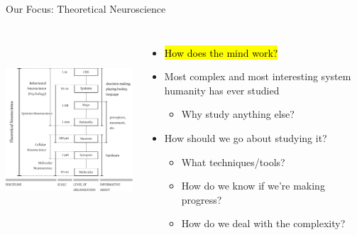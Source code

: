 \documentclass[handout,aspectratio=169]{beamer}
\begin{document}
\begin{frame}{Our Focus: Theoretical Neuroscience}
	\begin{columns}[c]
			\begin{center}
				\vspace{-0.5cm}
				\includegraphics[height=7cm]{media/levels.pdf}
			\end{center}
		\begin{itemize}
			\setlength\itemsep{0.25cm}
			\item<2-> \hl{How does the mind work?}
			\item<3-> Most complex and most interesting system humanity has ever studied\\[0.125cm]
			\begin{itemize}
				\setlength\itemsep{0.25cm}
				\item Why study anything else?
			\end{itemize}
			\item<4-> How should we go about studying it?\\[0.125cm]
			\begin{itemize}
				\setlength\itemsep{0.25cm}
				\item What techniques/tools?
				\item How do we know if we're making progress?
				\item How do we deal with the complexity?
			\end{itemize}
		\end{itemize}
	\end{columns}
\end{frame}
\end{document}
